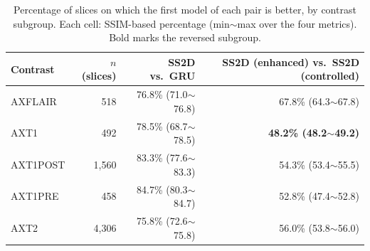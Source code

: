 \begin{table}[ht]
\centering
\caption{Percentage of slices on which the first model of each pair is better, by contrast subgroup. Each cell: SSIM-based percentage (min$\sim$max over the four metrics). Bold marks the reversed subgroup.}
\label{tab:contrast}
\begin{tabular}{lrrr}
\toprule
Contrast & $n$ (slices) & SS2D vs.\ GRU & SS2D (enhanced) vs.\ SS2D (controlled) \\
\midrule
AXFLAIR & 518 & 76.8\% (71.0$\sim$76.8) & 67.8\% (64.3$\sim$67.8) \\
AXT1 & 492 & 78.5\% (68.7$\sim$78.5) & \textbf{48.2\% (48.2$\sim$49.2)} \\
AXT1POST & 1{,}560 & 83.3\% (77.6$\sim$83.3) & 54.3\% (53.4$\sim$55.5) \\
AXT1PRE & 458 & 84.7\% (80.3$\sim$84.7) & 52.8\% (47.4$\sim$52.8) \\
AXT2 & 4{,}306 & 75.8\% (72.6$\sim$75.8) & 56.0\% (53.8$\sim$56.0) \\
\bottomrule
\end{tabular}
\end{table}
